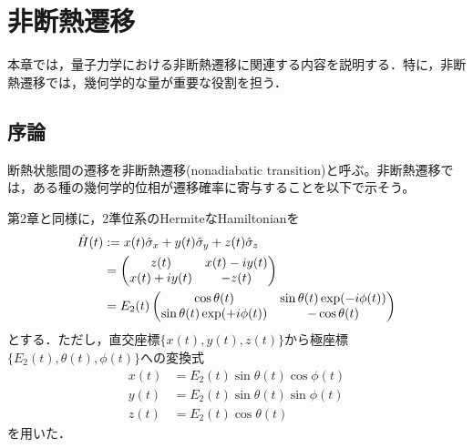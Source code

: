 \chapter{非断熱遷移}\label{NT}
本章では，量子力学における非断熱遷移に関連する内容を説明する．特に，非断熱遷移では，幾何学的な量が重要な役割を担う．


\section{序論}
断熱状態間の遷移を非断熱遷移(nonadiabatic transition)と呼ぶ。非断熱遷移では，ある種の幾何学的位相が遷移確率に寄与することを以下で示そう。


第2章と同様に，2準位系のHermiteなHamiltonianを
\begin{align}
  \Hat{H}(t)
  &:= x(t)\Hat{\sigma}_x + y(t) \Hat{\sigma}_y + z(t) \Hat{\sigma}_z\\
  &=
  \begin{pmatrix} 
  z(t) & x(t) - iy(t)\\
  x(t) + iy(t) & -z(t)\\
  \end{pmatrix}\\
  &= E_2(t)
  \begin{pmatrix} 
  \cos \theta(t) & \sin \theta(t) \exp(-i\phi(t))\\
  \sin \theta(t) \exp(+i\phi(t)) & -\cos \theta(t)\\
  \end{pmatrix}
\end{align}
とする．ただし，直交座標$\{x(t), y(t), z(t)\}$から極座標$\{E_2(t), \theta(t), \phi(t)\}$への変換式
\begin{align}
  x(t) &= E_2(t) \sin \theta(t) \cos \phi(t)\\
  y(t) &= E_2(t) \sin \theta(t) \sin \phi(t)\\
  z(t) &= E_2(t) \cos \theta(t)
\end{align}
を用いた．


